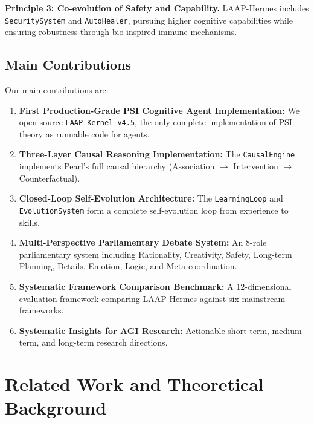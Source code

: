 \documentclass[10pt,twocolumn,letterpaper]{article}
\begin{document}
\textbf{Principle 3: Co-evolution of Safety and Capability.} LAAP-Hermes includes \texttt{SecuritySystem} and \texttt{AutoHealer}, pursuing higher cognitive capabilities while ensuring robustness through bio-inspired immune mechanisms.

\subsection{Main Contributions}
\label{ssec:contributions}

Our main contributions are:

\begin{enumerate}
    \item \textbf{First Production-Grade PSI Cognitive Agent Implementation:} We open-source \texttt{LAAP Kernel v4.5}, the only complete implementation of PSI theory as runnable code for agents.
    
    \item \textbf{Three-Layer Causal Reasoning Implementation:} The \texttt{CausalEngine} implements Pearl's full causal hierarchy (Association $\rightarrow$ Intervention $\rightarrow$ Counterfactual).
    
    \item \textbf{Closed-Loop Self-Evolution Architecture:} The \texttt{LearningLoop} and \texttt{EvolutionSystem} form a complete self-evolution loop from experience to skills.
    
    \item \textbf{Multi-Perspective Parliamentary Debate System:} An 8-role parliamentary system including Rationality, Creativity, Safety, Long-term Planning, Details, Emotion, Logic, and Meta-coordination.
    
    \item \textbf{Systematic Framework Comparison Benchmark:} A 12-dimensional evaluation framework comparing LAAP-Hermes against six mainstream frameworks.
    
    \item \textbf{Systematic Insights for AGI Research:} Actionable short-term, medium-term, and long-term research directions.
\end{enumerate}


\section{Related Work and Theoretical Background}
\label{sec:related_work}
\end{document}
